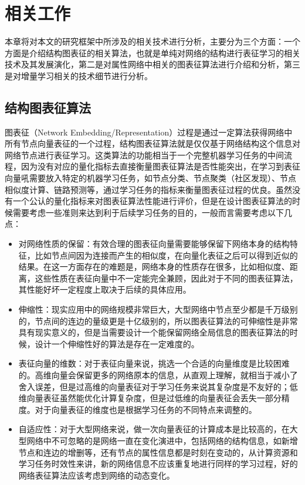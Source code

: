 \chapter{相关工作}
本章将对本文的研究框架中所涉及的相关技术进行分析，主要分为三个方面：一个方面是介绍结构图表征的相关算法，也就是单纯对网络的结构进行表征学习的相关技术及其发展演化，第二是对属性网络中相关的图表征算法进行介绍和分析，第三是对增量学习相关的技术细节进行分析。



\section{结构图表征算法}
图表征（Network Embedding/Representation）过程是通过一定算法获得网络中所有节点向量表征的一个过程，结构图表征算法就是仅仅基于网络结构这个信息对网络节点进行表征学习。这类算法的功能相当于一个完整机器学习任务的中间流程，因为没有对应的量化指标去直接衡量图表征算法是否性能突出，在学习到表征向量吼需要放入特定的机器学习任务，如节点分类、节点聚类（社区发现）、节点相似度计算、链路预测等，通过学习任务的指标来衡量图表征过程的优良。虽然没有一个公认的量化指标来对图表征算法性能进行评价\cite{goyal2017graph}，但是在设计图表征算法的时候需要考虑一些准则来达到利于后续学习任务的目的，一般而言需要考虑以下几点：
\begin{itemize}
	\item { 对网络性质的保留：有效合理的图表征向量需要能够保留下网络本身的结构特征，比如节点间因为连接而产生的相似度，在向量化表征之后可以得到近似的结果。在这一方面存在的难题是，网络本身的性质存在很多，比如相似度、距离，这些性质在表征向量中不一定能完全兼顾，因此对于不同的图表征算法，其性能好坏一定程度上取决于后续的具体应用。}
	\item {伸缩性：现实应用中的网络规模非常巨大，大型网络中节点至少都是千万级别的，节点间的连边的量级更是十亿级别的，所以图表征算法的可伸缩性是非常具有现实意义的，但是当需要设计一个能保留网络全局信息的图表征算法的时候，设计一个伸缩性好的算法是存在一定难度的。}
	\item {表征向量的维数：对于表征向量来说，挑选一个合适的向量维度是比较困难的。高维向量会保留更多的网络原本的信息，从直观上理解，就相当于减小了舍入误差，但是过高维的向量表征对于学习任务来说其复杂度是不友好的；低维向量表征虽然能优化计算复杂度，但是过低维的向量表征会丢失一部分精度。对于向量表征的维度也是根据学习任务的不同特点来调整的。}
	\item {自适应性：对于大型网络来说，做一次向量表征的计算成本是比较高的，在大型网络中不可忽略的是网络一直在变化演进中，包括网络的结构信息，如新增节点和连边的增删等，还有节点的属性信息都是时刻在变动的，从计算资源和学习任务时效性来讲，新的网络信息不应该重复地进行同样的学习过程，好的网络表征算法应该考虑到网络的动态变化。}
\end{itemize}

